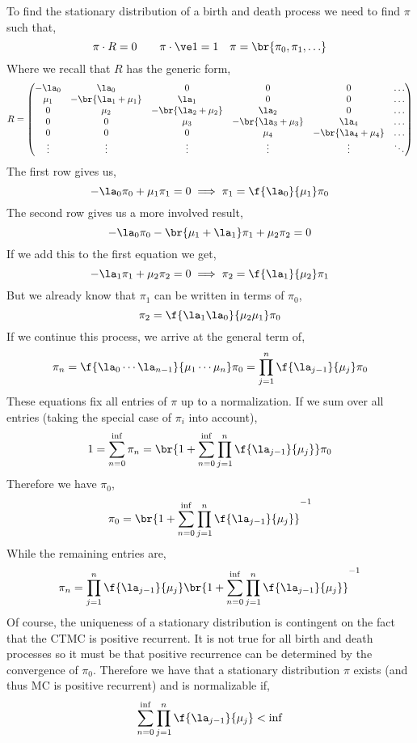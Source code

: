 \documentclass{article}
\begin{document}
    To find the stationary distribution of a birth and death process we need to find $\pi$ such that,
    \[ \pi \cdot R = 0 \qquad \pi \cdot \ve 1 = 1 \quad \pi = \br{\pi_0, \pi_1, \ldots} \]
    Where we recall that $R$ has the generic form,
    \[ R = \begin{pmatrix}
        - \la_0 & \la_0 & 0 & 0 & 0 & \ldots \\
        \mu_1 & -\br{\la_1 + \mu_1} & \la_1 & 0 & 0 & \ldots \\
        0 & \mu_2 & -\br{\la_2 + \mu_2} & \la_2 & 0 & \ldots \\
        0 & 0 & \mu_3 & -\br{\la_3 + \mu_3} & \la_4 & \ldots \\
        0 & 0 & 0 & \mu_4 & -\br{\la_4 + \mu_4} & \ldots \\
        \vdots & \vdots & \vdots & \vdots & \vdots & \ddots \\
    \end{pmatrix} \]
    The first row gives us,
    \[ -\la_0 \pi_0 + \mu_1 \pi_1 = 0 \implies \pi_1 = \f{\la_0}{\mu_1} \pi_0 \]
    The second row gives us a more involved result,
    \[ -\la_0 \pi_0 - \br{\mu_1 + \la_1} \pi_1 + \mu_2 \pi_2 = 0 \]
    If we add this to the first equation we get,
    \[ -\la_1 \pi_1 + \mu_2 \pi_2 = 0 \implies \pi_2 = \f{\la_1}{\mu_2} \pi_1 \]
    But we already know that $\pi_1$ can be written in terms of $\pi_0$,
    \[ \pi_2 = \f{\la_1 \la_0}{\mu_2 \mu_1} \pi_0 \]
    If we continue this process, we arrive at the general term of,
    \[ \pi_n = \f{\la_0 \cdots \la_{n-1}}{\mu_1 \cdots \mu_n} \pi_0 = \prod_{j=1}^{n}\f{\la_{j-1}}{\mu_j} \pi_0 \]
    These equations fix all entries of $\pi$ up to a normalization. If we sum over all entries (taking the special case of $\pi_i$ into account),
    \[ 1 = \sum_{n=0}^{\inf} \pi_n = \br{1+ \sum_{n=0}^{\inf} \prod_{j=1}^{n}\f{\la_{j-1}}{\mu_j}} \pi_0 \]
    Therefore we have $\pi_0$,
    \[ \pi_0 = \br{1+ \sum_{n=0}^{\inf} \prod_{j=1}^{n}\f{\la_{j-1}}{\mu_j}}^{-1} \]
    While the remaining entries are,
    \[ \pi_n = \prod_{j=1}^{n}\f{\la_{j-1}}{\mu_j}\br{1+ \sum_{n=0}^{\inf} \prod_{j=1}^{n}\f{\la_{j-1}}{\mu_j}}^{-1} \]
    Of course, the uniqueness of a stationary distribution is contingent on the fact that the CTMC is positive recurrent. It is not true for all birth and death processes so it must be that positive recurrence can be determined by the convergence of $\pi_0$. Therefore we have that a stationary distribution $\pi$ exists (and thus MC is positive recurrent) and is normalizable if,
    \[ \sum_{n=0}^{\inf} \prod_{j=1}^{n}\f{\la_{j-1}}{\mu_j} < \inf \]
\end{document}
